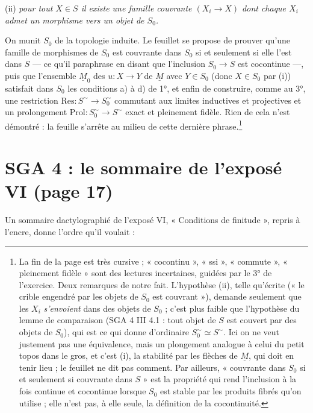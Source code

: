 \documentclass[11pt,a4paper]{article}
\begin{document}
(ii) \emph{pour tout $X \in S$ il existe une famille couvrante $(X_i \to X)$
dont chaque $X_i$ admet un morphisme vers un objet de $S_0$.}

On munit $S_0$ de la topologie induite. Le feuillet se propose de prouver
qu'une famille de morphismes de $S_0$ est couvrante dans $S_0$ si et
seulement si elle l'est dans $S$ --- ce qu'il paraphrase en disant que
l'inclusion $S_0 \to S$ est cocontinue ---, puis que l'ensemble
$\underline{M}_0$ des $u : X \to Y$ de $\underline{M}$ avec $Y \in S_0$ (donc
$X \in S_0$ par (i)) satisfait dans $S_0$ les conditions a) à d) de 1°, et
enfin de construire, comme au 3°, une restriction
$\mathrm{Res} : S^{\sim} \to S_0^{\sim}$ commutant aux limites inductives et
projectives et un prolongement
$\mathrm{Prol} : S_0^{\sim} \to S^{\sim}$ exact et pleinement fidèle.
Rien de cela n'est démontré : la feuille s'arrête au milieu de cette
dernière phrase.\footnote{La fin de la page est très cursive ; « cocontinu »,
« ssi », « commute », « pleinement fidèle » sont des lectures incertaines,
guidées par le 3° de l'exercice. Deux remarques de notre fait. L'hypothèse
(ii), telle qu'écrite (« le crible engendré par les objets de $S_0$ est
couvrant »), demande seulement que les $X_i$ \emph{s'envoient} dans des
objets de $S_0$ ; c'est plus faible que l'hypothèse du lemme de comparaison
(SGA 4 III 4.1 : tout objet de $S$ est couvert par des objets de $S_0$), qui
est ce qui donne d'ordinaire $S_0^{\sim} \simeq S^{\sim}$. Ici on ne veut
justement pas une équivalence, mais un plongement analogue à celui du petit
topos dans le gros, et c'est (i), la stabilité par les flèches de
$\underline{M}$, qui doit en tenir lieu ; le feuillet ne dit pas comment. Par
ailleurs, « couvrante dans $S_0$ si et seulement si couvrante dans $S$ » est
la propriété qui rend l'inclusion à la fois continue et cocontinue lorsque
$S_0$ est stable par les produits fibrés qu'on utilise ; elle n'est pas, à
elle seule, la définition de la cocontinuité.}

\section*{SGA 4 : le sommaire de l'exposé VI (page 17)}

Un sommaire dactylographié de l'exposé VI, « Conditions de finitude », repris
à l'encre, donne l'ordre qu'il voulait :
\end{document}

